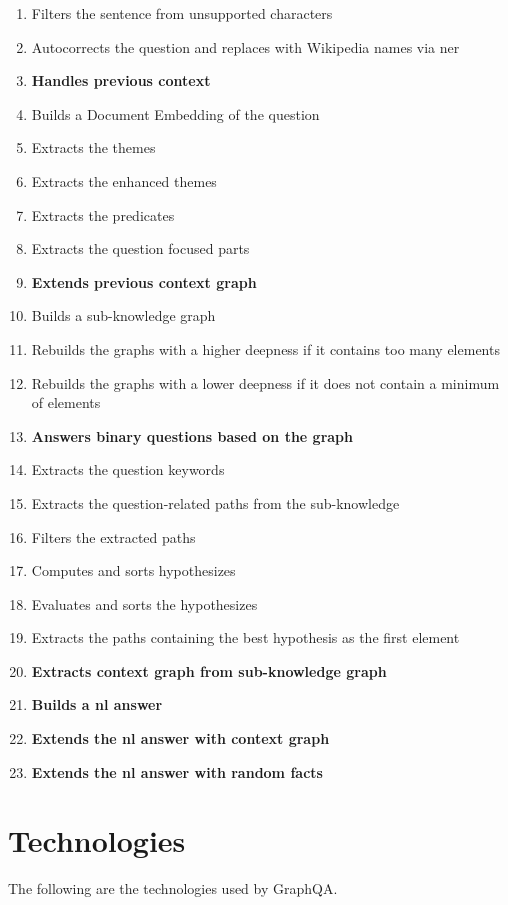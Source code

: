 \begin{enumerate}
    \setlength\itemsep{0em}
    \item Filters the sentence from unsupported characters
    \item Autocorrects the question and replaces with Wikipedia names via \gls{ner}
    \item \textbf{Handles previous context}
    \item Builds a Document Embedding of the question
    \item Extracts the themes
    \item Extracts the enhanced themes
    \item Extracts the predicates
    \item Extracts the question focused parts
    \item \textbf{Extends previous context graph}
    \item Builds a sub-knowledge graph
    \item Rebuilds the graphs with a higher deepness if it contains too many elements
    \item Rebuilds the graphs with a lower deepness if it does not contain a minimum of elements
    \item \textbf{Answers binary questions based on the graph}
    \item Extracts the question keywords
    \item Extracts the question-related paths from the sub-knowledge
    \item Filters the extracted paths
    \item Computes and sorts hypothesizes
    \item Evaluates and sorts the hypothesizes
    \item Extracts the paths containing the best hypothesis as the first element
    \item \textbf{Extracts context graph from sub-knowledge graph}
    \item \textbf{Builds a \gls{nl} answer}
    \item \textbf{Extends the \gls{nl} answer with context graph}
    \item \textbf{Extends the \gls{nl} answer with random facts}
\end{enumerate}


\section{Technologies}
\label{graphqa:techno}
The following are the technologies used by GraphQA.

